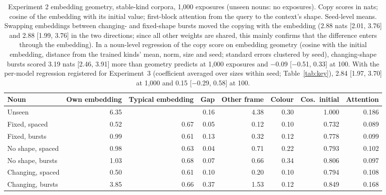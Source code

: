 \begin{table}[!htbp]
\centering\small
\caption{Experiment 2 embedding geometry, stable-kind corpora, 1,000 exposures (unseen nouns: no exposures). Copy scores in nats; cosine of the embedding with its initial value; first-block attention from the query to the context's shape. Seed-level means. Swapping embeddings between changing- and fixed-shape bursts moved the copying with the embedding (2.88 nats [2.01, 3.76] and 2.88 [1.99, 3.76] in the two directions; since all other weights are shared, this mainly confirms that the difference enters through the embedding). In a noun-level regression of the copy score on embedding geometry (cosine with the initial embedding, distance from the trained kinds' mean, norm, size and seed; standard errors clustered by seed), changing-shape bursts scored 3.19 nats [2.46, 3.91] more than geometry predicts at 1,000 exposures and $-$0.09 [$-$0.51, 0.33] at 100. With the per-model regression registered for Experiment~3 (coefficient averaged over sizes within seed; Table~\ref{tab:key}), 2.84 [1.97, 3.70] at 1,000 and 0.15 [$-$0.29, 0.58] at 100.}
\label{tab:N13}
\begin{tabular}{@{}lrrrrrrr@{}}
\toprule
Noun & Own embedding & Typical embedding & Gap & Other frame & Colour & Cos.\ initial & Attention \\
\midrule
Unseen & 6.35 &  & 0.16 & 4.38 & \textminus{}0.30 & 1.000 & 0.186 \\
Fixed, spaced & 0.52 & 0.67 & 0.05 & 0.12 & \textminus{}0.10 & 0.732 & 0.089 \\
Fixed, bursts & 0.99 & 0.61 & 0.13 & 0.32 & \textminus{}0.12 & 0.778 & 0.099 \\
No shape, spaced & 0.98 & 0.63 & \textminus{}0.04 & 0.71 & \textminus{}0.22 & 0.793 & 0.102 \\
No shape, bursts & 1.03 & 0.68 & \textminus{}0.07 & 0.66 & \textminus{}0.34 & 0.806 & 0.097 \\
Changing, spaced & 0.50 & 0.61 & 0.10 & 0.20 & \textminus{}0.10 & 0.794 & 0.108 \\
Changing, bursts & 3.85 & 0.66 & 0.37 & 1.53 & \textminus{}0.12 & 0.849 & 0.168 \\
\bottomrule
\end{tabular}
\end{table}

